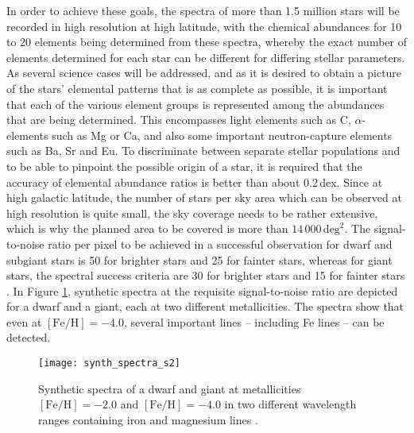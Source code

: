 \documentclass[a4paper,11pt]{article}
\begin{document}
In order to achieve these goals, the spectra of more than 1.5 million stars will be recorded in high resolution at high latitude, with the chemical abundances for 10 to 20 elements being determined from these spectra, whereby the exact number of elements determined for each star can be different for differing stellar parameters. As several science cases will be addressed, and as it is desired to obtain a picture of the stars' elemental patterns that is as complete as possible, it is important that each of the various element groups is represented among the abundances that are being determined. This encompasses light elements such as C, $\alpha$-elements such as Mg or Ca, and also some important neutron-capture elements such as Ba, Sr and Eu. To discriminate between separate stellar populations and to be able to pinpoint the possible origin of a star, it is required that the accuracy of elemental abundance ratios is better than about 0.2\,dex. Since at high galactic latitude, the number of stars per sky area which can be observed at high resolution is quite small, the sky coverage needs to be rather extensive, which is why the planned area to be covered is more than $14\,000\,\mathrm{deg}^2$. The signal-to-noise ratio per pixel to be achieved in a successful observation for dwarf and subgiant stars is 50 for brighter stars and 25 for fainter stars, whereas for giant stars, the spectral success criteria are 30 for brighter stars and 15 for fainter stars \citep{4mosts219}. In Figure \ref{fig:synth_spectr_s2}, synthetic spectra at the requisite signal-to-noise ratio are depicted for a dwarf and a giant, each at two different metallicities. The spectra show that even at $\mathrm{[Fe/H]}=-4.0$, several important lines -- including Fe lines -- can be detected.
%
\begin{figure}
 \centering
 \texttt{[image: synth\_spectra\_s2]}
 \caption[Synthetic spectrum of dwarf and giant for S2]{Synthetic spectra of a dwarf and giant at metallicities $\mathrm{[Fe/H]}=-2.0$ and $\mathrm{[Fe/H]}=-4.0$ in two different wavelength ranges containing iron and magnesium lines \citep{4mosts219}.}
 \label{fig:synth_spectr_s2}
\end{figure}\\ \\
%
\end{document}
